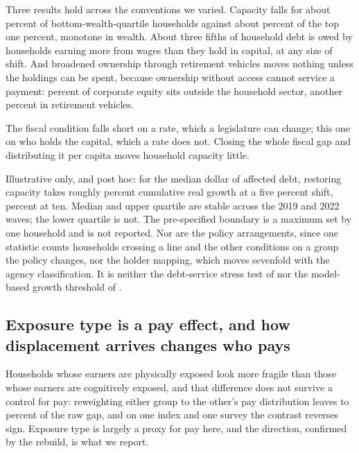 Three results hold across the conventions we varied. Capacity falls for about  percent
of bottom-wealth-quartile households against about  percent of
the top one percent, monotone in wealth. About three fifths of household debt is owed by
households earning more from wages than they hold in capital, at any size of shift. And
broadened ownership through retirement vehicles moves nothing unless the holdings can be
spent, because ownership without access cannot service a payment:
 percent of corporate equity sits outside the household
sector, another  percent in retirement vehicles.

The fiscal condition falls short on a rate, which a legislature can change; this one on who
holds the capital, which a rate does not. Closing the whole fiscal gap and distributing it
per capita moves household capacity little.

Illustrative only, and post hoc: for the median dollar of affected debt, restoring capacity
takes roughly  percent cumulative real growth at a five percent shift,
 percent at ten. Median and upper quartile are stable across the 2019
and 2022 waves; the lower quartile is not. The pre-specified boundary is a maximum set by
one household and is not reported. Nor are the policy arrangements, since one statistic
counts households crossing a line and the other conditions on a group the policy changes,
nor the holder mapping, which moves sevenfold with the agency classification. It is neither
the debt-service stress test of \citet{BartscherKuhnSchularickSteins2020} nor the
model-based growth threshold of \citet{Bayraktar2026}.

\subsection{Exposure type is a pay effect, and how displacement arrives changes who pays}

Households whose earners are physically exposed look more fragile than those whose earners are
cognitively exposed, and that difference does not survive a control for pay: reweighting either
group to the other's pay distribution leaves  to
 percent of the raw gap, and on one index and one survey the contrast
reverses sign. Exposure type is largely a proxy for pay here, and the direction, confirmed by the
rebuild, is what we report.

